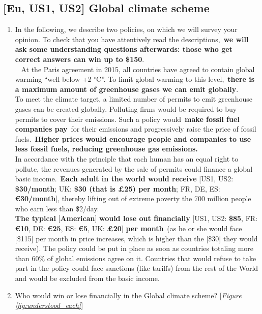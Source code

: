 \subsection*{[Eu, US1, US2] Global climate scheme}\label{subsec:questionnaire_GCS}
\begin{enumerate}[resume] \item[] In the following, we describe two policies, on which we will survey your opinion. To check that you have attentively read the descriptions,~\textbf{we will ask some understanding questions afterwards: those who get correct answers can win up to \$150}. \\
\textbf{}~ At the Paris agreement in 2015, all countries have agreed to contain global warming ``well below +2 $\mathrm{{}^\circ}$C''. To limit global warming to this level,~\textbf{there is a maximum amount of greenhouse gases we can emit globally}.\\
To meet the climate target, a limited number of permits to emit greenhouse gases can be created globally. Polluting firms would be required to buy permits to cover their emissions. Such a policy would~\textbf{make fossil fuel companies pay}~for their emissions and progressively raise the price of fossil fuels.~\textbf{Higher prices would encourage people and companies to use less fossil fuels, reducing greenhouse gas emissions.}\\
In accordance with the principle that each human has an equal right to pollute, the revenues generated by the sale of permits could finance a global basic income.~\textbf{Each adult in the world would receive } [US1, US2: \textbf{\$30/month}; UK: \textbf{\$30 (that is £25) per month}; FR, DE, ES:  \textbf{\euro{}30/month}], thereby lifting out of extreme poverty the 700 million people who earn less than \$2/day.\\
\textbf{The typical }[\textbf{American}]\textbf{ would lose out financially }[US1, US2: \textbf{\$85}, FR: \textbf{\euro{}10}, DE: \textbf{\euro{}25}, ES: \textbf{\euro{}5}, UK: \textbf{£20}]\textbf{ per month}~(as he or she would face [\$115] per month in price increases, which is higher than the [\$30] they would receive). The policy could be put in place as soon as countries totaling more than 60\% of global emissions agree on it. Countries that would refuse to take part in the policy could face sanctions (like tariffs) from the rest of the World and would be excluded from the basic income.
\item \label{q:understood_gcs} Who would win or lose financially in the Global climate scheme? [\textit{Figure \ref{fig:understood_each}}] \\

\end{enumerate}
